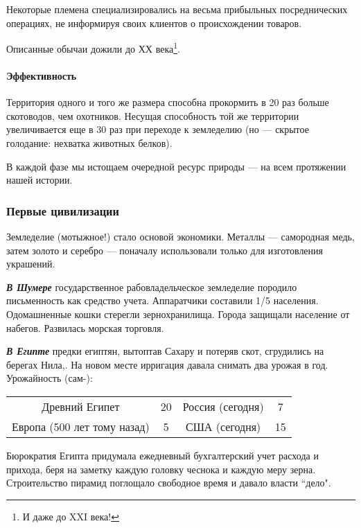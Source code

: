 Некоторые племена специализировались на весьма прибыльных посреднических операциях, не информируя своих клиентов о
происхождении товаров.

Описанные обычаи дожили до ХХ века\footnote{И даже до \foreignlanguage{english}{XXI}
века!}. 

\paragraph[Эффективность ]{Эффективность}
Территория одного и того же размера способна прокормить в 20 раз больше скотоводов, чем охотников. Несущая способность
той же территории увеличивается еще в 30 раз при переходе к земледелию (но — скрытое голодание: нехватка животных
белков).

В каждой фазе мы истощаем очередной ресурс природы — на всем протяжении нашей истории.

\subsubsection[Первые цивилизации]{Первые цивилизации}
Земледелие (мотыжное!) стало основой экономики. Металлы — самородная медь, затем золото и серебро — поначалу
использовали только для изготовления украшений.

\textbf{\textit{В Шумере}} государственное рабовладельческое земледелие породило письменность как средство учета.
Аппаратчики составили 1/5 населения. Одомашненные кошки стерегли зернохранилища. Города защищали население от набегов.
Развилась морская торговля.

\textbf{\textit{В Египте}} предки египтян, вытоптав Сахару и потеряв скот, сгрудились на берегах Нила,. На новом месте
ирригация давала снимать два урожая в год. Урожайность (сам-):

\begin{center}
\tablefirsthead{}
\tablehead{}
\tabletail{}
\tablelasttail{}
\begin{supertabular}{cccc}
Древний Египет & 20 & Россия (сегодня) &  7\\
 Европа (500 лет тому назад) &  5 & США (сегодня) & 15\\
\end{supertabular}
\end{center}

Бюрократия Египта придумала ежедневный бухгалтерский учет расхода и прихода, беря на заметку каждую головку чеснока и
каждую меру зерна. Строительство пирамид поглощало свободное время и давало власти ``дело".

